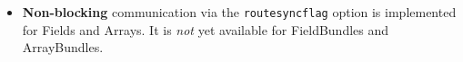 
\begin{itemize}
\item {\bf Non-blocking} communication via the {\tt routesyncflag} option is implemented for Fields and Arrays. It is {\em not} yet available for FieldBundles and ArrayBundles.
\end{itemize}
